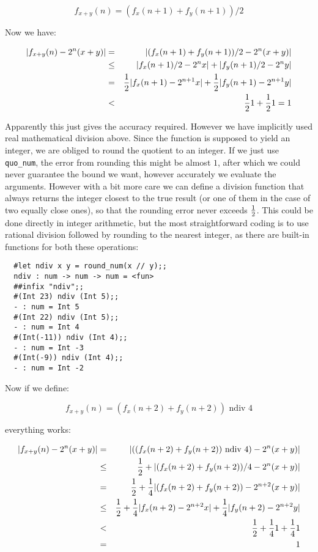 $$ f_{x + y}(n) = (f_x(n + 1) + f_y(n + 1)) / 2 $$

\noindent Now we have:

\begin{eqnarray*}
|f_{x + y}(n) - 2^n (x + y)|
& = & |(f_x(n + 1) + f_y(n + 1)) / 2 - 2^n (x + y)|             \\
& \leq & |f_x(n + 1) / 2 - 2^n x| + |f_y(n + 1) / 2 - 2^n y|    \\
& = & {1 \over 2} |f_x(n + 1) - 2^{n + 1} x| +
      {1 \over 2} |f_y(n + 1) - 2^{n + 1} y|                    \\
& < & {1 \over 2} 1 + {1 \over 2} 1 = 1
\end{eqnarray*}

Apparently this just gives the accuracy required. However we have implicitly
used real mathematical division above. Since the function is supposed to yield
an integer, we are obliged to round the quotient to an integer. If we just use
{\tt quo\_num}, the error from rounding this might be almost $1$, after which
we could never guarantee the bound we want, however accurately we evaluate the
arguments. However with a bit more care we can define a division function that
always returns the integer closest to the true result (or one of them in the
case of two equally close ones), so that the rounding error never exceeds $1
\over 2$. This could be done directly in integer arithmetic, but the most
straightforward coding is to use rational division followed by rounding to the
nearest integer, as there are built-in functions for both these operations:

\begin{boxed}\begin{verbatim}
  #let ndiv x y = round_num(x // y);;
  ndiv : num -> num -> num = <fun>
  ##infix "ndiv";;
  #(Int 23) ndiv (Int 5);;
  - : num = Int 5
  #(Int 22) ndiv (Int 5);;
  - : num = Int 4
  #(Int(-11)) ndiv (Int 4);;
  - : num = Int -3
  #(Int(-9)) ndiv (Int 4);;
  - : num = Int -2
\end{verbatim}\end{boxed}

\noindent Now if we define:

$$ f_{x + y}(n) = (f_x(n + 2) + f_y(n + 2)) \mbox{ ndiv } 4 $$

\noindent everything works:

\begin{eqnarray*}
|f_{x + y}(n) - 2^n (x + y)|
& =    & |((f_x(n + 2) + f_y(n + 2)) \mbox{ ndiv } 4) - 2^n (x + y)|    \\
& \leq & {1 \over 2} + |(f_x(n + 2) + f_y(n + 2)) / 4 - 2^n (x + y)|     \\
& =    & {1 \over 2} + {1 \over 4} |(f_x(n + 2) + f_y(n + 2)) -
                                     2^{n + 2}(x + y)|                  \\
& \leq & {1 \over 2} + {1 \over 4} |f_x(n + 2) - 2^{n + 2} x| +
                       {1 \over 4} |f_y(n + 2) - 2^{n + 2} y|           \\
& <    & {1 \over 2} + {1 \over 4} 1 + {1 \over 4} 1                    \\
&=     & 1
\end{eqnarray*}

